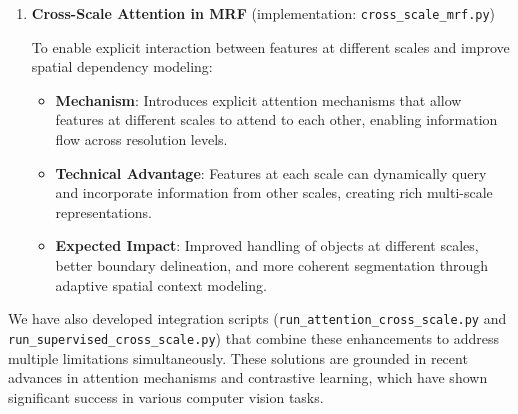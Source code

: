 \documentclass[conference]{IEEEtran}
\begin{document}
\begin{enumerate}
    \begin{itemize}
        \item \textbf{Higher Contrastive Weight}: Increasing the weight from 0.5 to 1.0 to emphasize the importance of learning discriminative representations.
        \item \textbf{Supervised Contrastive Component}: Adding a supervised contrastive loss that leverages class labels when available, creating cleaner separation between different semantic categories.
        \item \textbf{Technical Advantage}: The supervised component introduces explicit semantic guidance into the otherwise unsupervised contrastive learning process.
        \item \textbf{Expected Impact}: More discriminative features that better separate different land cover types, leading to more accurate segmentation even with limited labeled data.
    \end{itemize}
    
    \item \textbf{Cross-Scale Attention in MRF} (implementation: \texttt{cross\_scale\_mrf.py})
    
    To enable explicit interaction between features at different scales and improve spatial dependency modeling:
    
    \begin{itemize}
        \item \textbf{Mechanism}: Introduces explicit attention mechanisms that allow features at different scales to attend to each other, enabling information flow across resolution levels.
        \item \textbf{Technical Advantage}: Features at each scale can dynamically query and incorporate information from other scales, creating rich multi-scale representations.
        \item \textbf{Expected Impact}: Improved handling of objects at different scales, better boundary delineation, and more coherent segmentation through adaptive spatial context modeling.
    \end{itemize}
\end{enumerate}

We have also developed integration scripts (\texttt{run\_attention\_cross\_scale.py} and \texttt{run\_supervised\_cross\_scale.py}) that combine these enhancements to address multiple limitations simultaneously. These solutions are grounded in recent advances in attention mechanisms and contrastive learning, which have shown significant success in various computer vision tasks.
\end{document}
